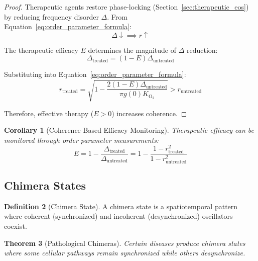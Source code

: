 \documentclass[11pt,twocolumn,a4paper]{article}
\newtheorem{theorem}{Theorem}[section]
\newtheorem{corollary}[theorem]{Corollary}
\theoremstyle{definition}
\newtheorem{definition}[theorem]{Definition}
\theoremstyle{remark}
\begin{document}
\begin{proof}
Therapeutic agents restore phase-locking (Section~\ref{sec:therapeutic_eos}) by reducing frequency disorder $\Delta$. From Equation~\eqref{eq:order_parameter_formula}:
\begin{equation}
\Delta \downarrow \implies r \uparrow
\end{equation}

The therapeutic efficacy $E$ determines the magnitude of $\Delta$ reduction:
\begin{equation}
\Delta_{\mathrm{treated}} = (1 - E) \Delta_{\mathrm{untreated}}
\label{eq:disorder_reduction}
\end{equation}

Substituting into Equation~\eqref{eq:order_parameter_formula}:
\begin{equation}
r_{\mathrm{treated}} = \sqrt{1 - \frac{2(1-E)\Delta_{\mathrm{untreated}}}{\pi g(0) K_{\mathrm{O_2}}}} > r_{\mathrm{untreated}}
\end{equation}

Therefore, effective therapy ($E > 0$) increases coherence.
\end{proof}

\begin{corollary}[Coherence-Based Efficacy Monitoring]
\label{cor:coherence_monitoring}
Therapeutic efficacy can be monitored through order parameter measurements:
\begin{equation}
E = 1 - \frac{\Delta_{\mathrm{treated}}}{\Delta_{\mathrm{untreated}}} = 1 - \frac{1 - r_{\mathrm{treated}}^2}{1 - r_{\mathrm{untreated}}^2}
\label{eq:efficacy_from_coherence}
\end{equation}
\end{corollary}

\subsection{Chimera States}

\begin{definition}[Chimera State]
\label{def:chimera}
A chimera state is a spatiotemporal pattern where coherent (synchronized) and incoherent (desynchronized) oscillators coexist.
\end{definition}

\begin{theorem}[Pathological Chimeras]
\label{thm:pathological_chimeras}
Certain diseases produce chimera states where some cellular pathways remain synchronized while others desynchronize.
\end{theorem}
\end{document}
